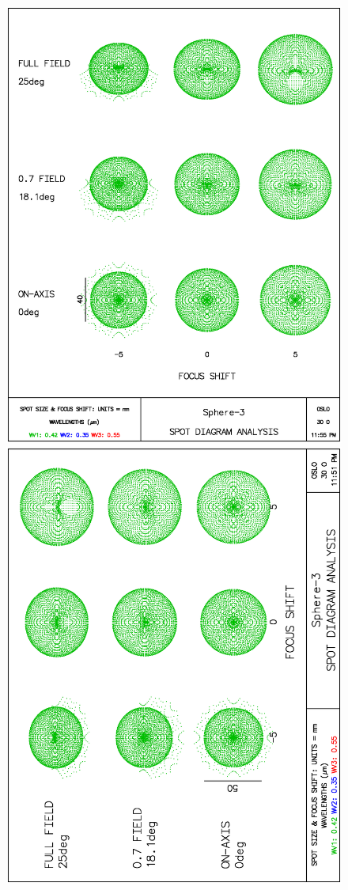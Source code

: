 \documentclass[a4paper,11pt]{article}
\begin{document}
\begin{figure}
\begin{minipage}[b]{.55\textwidth}
        \includegraphics[height=.2\textheight, angle=0]{Sphere3spot1.eps}
        \includegraphics[height=.2\textheight, angle=-90]{Sphere3spot.eps}

\end{minipage}
\end{figure}
\end{document}
